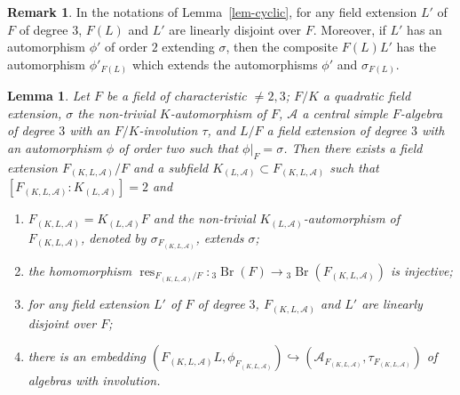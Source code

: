 \documentclass[10pt]{article}
\newtheorem{lemma}[theorem]{Lemma}
\theoremstyle{definition}
\newtheorem{remark}[theorem]{Remark}
\DeclareMathOperator{\Br}{Br}
\DeclareMathOperator{\res}{res}
\newcommand{\A}{\mathcal A}
\newcommand{\Fk}{F_{(K,L,\A)}}
\newcommand{\Kl}{K_{(L,\A)}}
\newcommand{\bthree}[1]{{}_3\Br(#1)}
\begin{document}
\begin{remark}
In the notations of Lemma~\ref{lem-cyclic}, for any field extension $L'$ of $F$ of degree $3$, $F(L)$ and $L'$ are linearly disjoint over $F$. Moreover, if $L'$ has an automorphism $\phi'$ of order $2$ extending $\sigma$, then the composite $F(L)L'$ has the automorphism $\phi'_{F(L)}$ which extends the automorphisms $\phi'$ and $\sigma_{F(L)}$.
\end{remark}
\begin{lemma}\label{lem-embedding}
Let $F$ be a field of characteristic $\neq2,3$; $F/K$ a quadratic field extension, $\sigma$ the non-trivial $K$-automorphism of $F$, $\A$ a central simple $F$-algebra of degree $3$ with an $F/K$-involution $\tau$, and $L/F$ a field extension of degree $3$ with an automorphism $\phi$ of order two such that $\phi|_F=\sigma$. Then there exists a field extension $\Fk/F$ and a subfield $\Kl\subset\Fk$ such that $[\Fk:\Kl]=2$ and
\begin{enumerate}
\item $\Fk=\Kl F$ and the non-trivial $\Kl$-automorphism of $\Fk$, denoted by $\sigma_{\Fk}$, extends $\sigma$;
\item the homomorphism $\res_{\Fk/F}:\bthree F\to\bthree{\Fk}$ is injective;
\item for any field extension $L'$ of $F$ of degree $3$, $\Fk$ and $L'$ are linearly disjoint over $F$;
\item there is an embedding $(\Fk L,\phi_{\Fk})\hookrightarrow(\A_{\Fk},\tau_{\Fk})$ of algebras with involution.
\end{enumerate}
\end{lemma}
\end{document}
